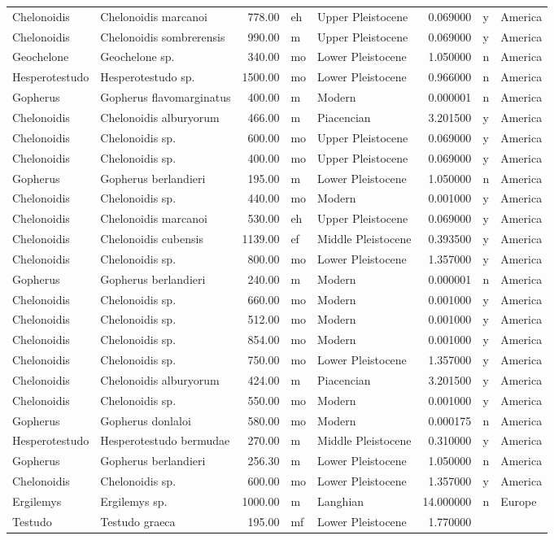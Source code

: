 \begin{landscape}
\begin{longtable}[]{@{}llrllrll@{}}
	Chelonoidis & Chelonoidis marcanoi & 778.00 & eh & Upper Pleistocene &
	0.069000 & y & America\tabularnewline
	Chelonoidis & Chelonoidis sombrerensis & 990.00 & m & Upper Pleistocene
	& 0.069000 & y & America\tabularnewline
	Geochelone & Geochelone sp. & 340.00 & mo & Lower Pleistocene & 1.050000
	& n & America\tabularnewline
	Hesperotestudo & Hesperotestudo sp. & 1500.00 & mo & Lower Pleistocene &
	0.966000 & n & America\tabularnewline
	Gopherus & Gopherus flavomarginatus & 400.00 & m & Modern & 0.000001 & n
	& America\tabularnewline
	Chelonoidis & Chelonoidis alburyorum & 466.00 & m & Piacencian &
	3.201500 & y & America\tabularnewline
	Chelonoidis & Chelonoidis sp. & 600.00 & mo & Upper Pleistocene &
	0.069000 & y & America\tabularnewline
	Chelonoidis & Chelonoidis sp. & 400.00 & mo & Upper Pleistocene &
	0.069000 & y & America\tabularnewline
	Gopherus & Gopherus berlandieri & 195.00 & m & Lower Pleistocene &
	1.050000 & n & America\tabularnewline
	Chelonoidis & Chelonoidis sp. & 440.00 & mo & Modern & 0.001000 & y &
	America\tabularnewline
	Chelonoidis & Chelonoidis marcanoi & 530.00 & eh & Upper Pleistocene &
	0.069000 & y & America\tabularnewline
	Chelonoidis & Chelonoidis cubensis & 1139.00 & ef & Middle Pleistocene &
	0.393500 & y & America\tabularnewline
	Chelonoidis & Chelonoidis sp. & 800.00 & mo & Lower Pleistocene &
	1.357000 & y & America\tabularnewline
	Gopherus & Gopherus berlandieri & 240.00 & m & Modern & 0.000001 & n &
	America\tabularnewline
	Chelonoidis & Chelonoidis sp. & 660.00 & mo & Modern & 0.001000 & y &
	America\tabularnewline
	Chelonoidis & Chelonoidis sp. & 512.00 & mo & Modern & 0.001000 & y &
	America\tabularnewline
	Chelonoidis & Chelonoidis sp. & 854.00 & mo & Modern & 0.001000 & y &
	America\tabularnewline
	Chelonoidis & Chelonoidis sp. & 750.00 & mo & Lower Pleistocene &
	1.357000 & y & America\tabularnewline
	Chelonoidis & Chelonoidis alburyorum & 424.00 & m & Piacencian &
	3.201500 & y & America\tabularnewline
	Chelonoidis & Chelonoidis sp. & 550.00 & mo & Modern & 0.001000 & y &
	America\tabularnewline
	Gopherus & Gopherus donlaloi & 580.00 & mo & Modern & 0.000175 & n &
	America\tabularnewline
	Hesperotestudo & Hesperotestudo bermudae & 270.00 & m & Middle
	Pleistocene & 0.310000 & y & America\tabularnewline
	Gopherus & Gopherus berlandieri & 256.30 & m & Lower Pleistocene &
	1.050000 & n & America\tabularnewline
	Chelonoidis & Chelonoidis sp. & 600.00 & mo & Lower Pleistocene &
	1.357000 & y & America\tabularnewline
	Ergilemys & Ergilemys sp. & 1000.00 & m & Langhian & 14.000000 & n &
	Europe\tabularnewline
	Testudo & Testudo graeca & 195.00 & mf & Lower Pleistocene & 1.770000 &

\end{longtable}
\end{landscape}
